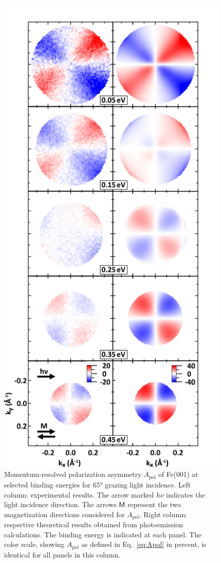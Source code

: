 \documentclass[prl,twocolumn,floatfix,superscriptaddress,aps]{revtex4-2}
\begin{document}
\begin{figure}
    \centering
    \includegraphics[width = 0.7\columnwidth]{FePaperApol.pdf}
    \caption{Momentum-resolved polarization asymmetry $A_{\mathrm{pol}}$ of Fe(001) at selected binding energies for 65° grazing light incidence. Left column: experimental results. The arrow marked $h \nu$ indicates the light incidence direction. The arrows $\textsf{M}$ represent the two magnetization directions considered for $A_{\mathrm{pol}}$. Right column: respective theoretical results obtained from photoemission calculations. The binding energy is indicated at each panel. The color scale, showing $A_{\mathrm{pol}}$ as defined in Eq.~\eqref{eq:Apol} in percent, is identical for all panels in this column. 
    }
    \label{fig:Apol}
\end{figure}
\end{document}

